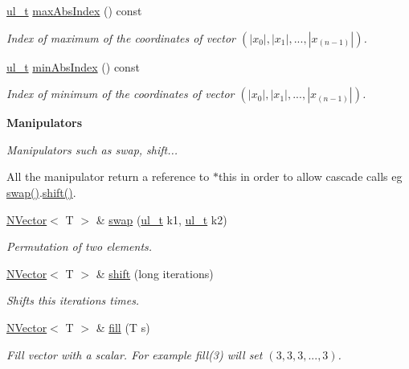 \begin{Indent}
\begin{DoxyCompactItemize}
\mbox{\hyperlink{group___n_algebra_ga1b140a2034db3f5dfe18a987745df43a}{ul\+\_\+t}} \mbox{\hyperlink{class_n_vector_ac7d7d39b68956da9018684a3706a70c2}{max\+Abs\+Index}} () const
\begin{DoxyCompactList}\small\item\em Index of maximum of the coordinates of vector $ (|x_0|, |x_1|, ..., |x_{(n-1)}|) $. \end{DoxyCompactList}\item 
\mbox{\hyperlink{group___n_algebra_ga1b140a2034db3f5dfe18a987745df43a}{ul\+\_\+t}} \mbox{\hyperlink{class_n_vector_a8b9147431ee1f9c5a25c6e0b2f793c40}{min\+Abs\+Index}} () const
\begin{DoxyCompactList}\small\item\em Index of minimum of the coordinates of vector $ (|x_0|, |x_1|, ..., |x_{(n-1)}|) $. \end{DoxyCompactList}\end{DoxyCompactItemize}
\end{Indent}
\begin{Indent}\textbf{ Manipulators}\par
{\em Manipulators such as swap, shift...

All the manipulator return a reference to {\ttfamily $\ast$this} in order to allow cascade calls eg {\ttfamily \mbox{\hyperlink{class_n_vector_a8ea2e2cffa2c3053d835d05a571dac88}{swap()}}.\mbox{\hyperlink{class_n_vector_aabe8585ef2659ce3fa7872c2b96e3b20}{shift()}}}. }\begin{DoxyCompactItemize}
\item 
\mbox{\hyperlink{class_n_vector}{N\+Vector}}$<$ T $>$ \& \mbox{\hyperlink{class_n_vector_a8ea2e2cffa2c3053d835d05a571dac88}{swap}} (\mbox{\hyperlink{group___n_algebra_ga1b140a2034db3f5dfe18a987745df43a}{ul\+\_\+t}} k1, \mbox{\hyperlink{group___n_algebra_ga1b140a2034db3f5dfe18a987745df43a}{ul\+\_\+t}} k2)
\begin{DoxyCompactList}\small\item\em Permutation of two elements. \end{DoxyCompactList}\item 
\mbox{\hyperlink{class_n_vector}{N\+Vector}}$<$ T $>$ \& \mbox{\hyperlink{class_n_vector_aabe8585ef2659ce3fa7872c2b96e3b20}{shift}} (long iterations)
\begin{DoxyCompactList}\small\item\em Shifts {\ttfamily this} {\ttfamily iterations} times. \end{DoxyCompactList}\item 
\mbox{\hyperlink{class_n_vector}{N\+Vector}}$<$ T $>$ \& \mbox{\hyperlink{class_n_vector_ae0e51edea3a6e998c5b6ff5336939e90}{fill}} (T s)
\begin{DoxyCompactList}\small\item\em Fill vector with a scalar. For example {\ttfamily fill(3)} will set $ (3, 3, 3, ..., 3) $. \end{DoxyCompactList}\end{DoxyCompactItemize}
\end{Indent}
